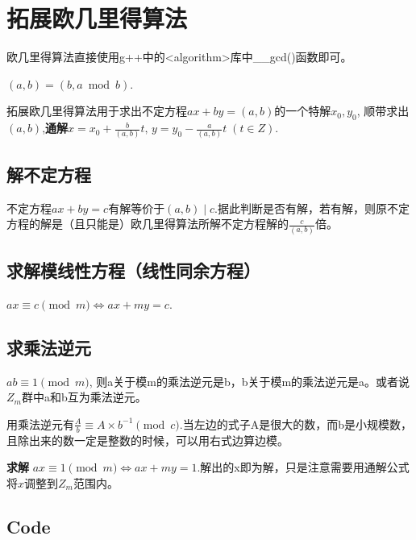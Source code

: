 \section{拓展欧几里得算法}
	\par 欧几里得算法直接使用g++中的<algorithm>库中\_\_gcd()函数即可。
	\par $(a,b)=(b,a \bmod b)$.
	\par 拓展欧几里得算法用于求出不定方程$ax+by=(a,b)$的一个特解$x_0,y_0$, 顺带求出$(a,b)$,{\bfseries 通解$x=x_0+\frac{b}{(a,b)}t,\,y=y_0-\frac{a}{(a,b)}t \; (t \in Z)$}.
	\subsection{解不定方程}
		\par 不定方程$ax+by=c$有解等价于$(a,b) \mid c$.据此判断是否有解，若有解，则原不定方程的解是（且只能是）欧几里得算法所解不定方程解的$\frac{c}{(a,b)}$倍。
	\subsection{求解模线性方程（线性同余方程）}
		$ax \equiv c\pmod{m} \Longleftrightarrow ax+my=c$.
	\subsection{求乘法逆元}
		\par $ab \equiv 1 \pmod{m}$, 则a关于模m的乘法逆元是b，b关于模m的乘法逆元是a。或者说$Z_m$群中a和b互为乘法逆元。
		\par 用乘法逆元有$\frac{A}{b} \equiv A \times b^{-1} \pmod{c}$.当左边的式子A是很大的数，而b是小规模数，且除出来的数一定是整数的时候，可以用右式边算边模。
		\par \textbf{求解} $ax \equiv 1 \pmod{m} \Longleftrightarrow ax+my= 1$.解出的x即为解，只是注意需要用通解公式将$x$调整到$Z_m$范围内。
	\subsection{Code}
	\begin{lstlisting}[language={c++}]

	\end{lstlisting}